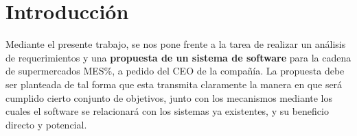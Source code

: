 
\section{Introducción}

Mediante el presente trabajo, se nos pone frente a la tarea de realizar un
análisis de requerimientos y una \textbf{propuesta de un sistema de software}
para la cadena de supermercados MES\%, a pedido del CEO de la compañía. La
propuesta debe ser planteada de tal forma que esta transmita claramente la
manera en que será cumplido cierto conjunto de objetivos, junto con los
mecanismos mediante los cuales el software se relacionará con los sistemas ya
existentes, y su beneficio directo y potencial.